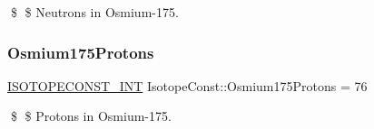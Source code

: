 \$ \$ Neutrons in Osmium-\/175. \mbox{\label{group___isotope_const-_osmium-_os175_gad80b90f66017fdaf087fe63bc20695ed}} 
\subsubsection{\texorpdfstring{Osmium175\+Protons}{Osmium175Protons}}
{\footnotesize\ttfamily \mbox{\hyperlink{group___isotope_const-_macros_ga5f18360b3e99483a35c32d789e62621c}{I\+S\+O\+T\+O\+P\+E\+C\+O\+N\+S\+T\+\_\+\+I\+NT}} Isotope\+Const\+::\+Osmium175\+Protons = 76}

\$ \$ Protons in Osmium-\/175. 